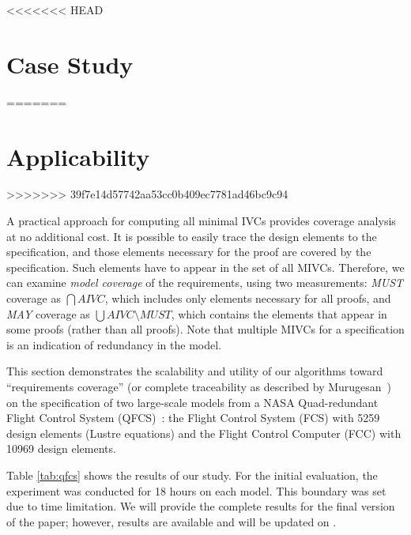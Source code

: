 <<<<<<< HEAD
\iffalse
\section{Case Study}
=======
\section{Applicability}
>>>>>>> 39f7e14d57742aa53cc0b409ec7781ad46bc9c94

\label{sec:qfc}

A practical approach for computing all minimal IVCs provides coverage analysis at no additional cost. 
It is possible to easily trace the design elements to the specification, and those elements necessary for the proof are covered by the specification. Such elements have to appear in the set of all MIVCs. Therefore, we can examine {\em model coverage} of the requirements, using two measurements: {\em MUST} coverage as $\bigcap AIVC$, which includes only elements necessary for all proofs, and {\em MAY} coverage as $\bigcup AIVC \setminus MUST$, which contains the elements that appear in some proofs (rather than all proofs). Note that multiple MIVCs for a specification is an indication of redundancy in the model.

This section demonstrates the scalability and utility of our algorithms toward ``requirements coverage'' 
(or complete traceability as described by Murugesan~\cite{Murugesan16:renext}) 
on the specification of two large-scale models from a NASA Quad-redundant Flight Control System (QFCS)~\cite{NFM2015:backes}: the Flight Control System (FCS) with 5259 design elements (Lustre equations) and the Flight Control Computer (FCC) with 10969 design elements.

Table \ref{tab:qfcs} shows the results of our study. For the initial evaluation, the experiment was conducted for 18 hours on each model. This boundary was set due to time limitation. We will provide the complete results for the final version of the paper; however, results are available and will be updated on \cite{expr}.



